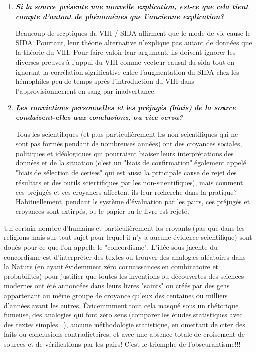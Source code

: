 \begin{enumerate}[label=\protect\circledbullet{\arabic*},leftmargin=15mm]
		\item \textit{\textbf{Si la source pr\'esente une nouvelle explication, est-ce que cela tient compte d'autant de ph\'enomènes que l'ancienne explication?}}
	
		Beaucoup de sceptiques du VIH / SIDA affirment que le mode de vie cause le SIDA. Pourtant, leur th\'eorie alternative n'explique pas autant de donn\'ees que la th\'eorie du VIH. Pour faire valoir leur argument, ils doivent ignorer les diverses preuves à l'appui du VIH comme vecteur causal du sida tout en ignorant la corr\'elation significative entre l'augmentation du SIDA chez les h\'emophiles peu de temps après l'introduction du VIH dans l'approvisionnement en sang par inadvertance.

		\item \textit{\textbf{Les convictions personnelles et les pr\'ejug\'es (biais) de la source conduisent-elles aux conclusions, ou vice versa?}}

		Tous les scientifiques (et plus particulièrement les non-scientifiques qui ne sont pas form\'es pendant de nombreuses ann\'ees) ont des croyances sociales, politiques et id\'eologiques qui pourraient biaiser leurs interpr\'etations des donn\'ees et de la situation (c'est un "biais de confirmation" \'egalement appel\'e "biais de s\'election de cerises" qui est aussi la principale cause de rejet des r\'esultats et des outils scientifiques par les non-scientifiques), mais comment ces pr\'ejug\'es et ces croyances affectent-ils leur recherche dans la pratique? Habituellement, pendant le système d'\'evaluation par les pairs, ces pr\'ejug\'es et croyances sont extirp\'es, ou le papier ou le livre est rejet\'e. 
	\end{enumerate}
	
	Un certain nombre d'humains et particulièrement les croyants (pas que dans les religions mais sur tout sujet pour lequel il n'y a aucune évidence scientifique) sont doués pour ce que l'on appelle le "concordisme". L'idée sous-jacente du concordisme est d'interpréter des textes ou trouver des analogies aléatoires dans la Nature (en ayant évidemment zéro connaissances en combinatoire et probabilités) pour justifier que toutes les inventions ou découvertes des sciences modernes ont été annoncées dans leurs livres "saints" ou créés par des gens appartenant au même groupe de croyance qu'eux des centaines ou milliers d'années avant les autres. Évidemmment tout cela masqué sous un rhétorique fumeuse, des analogies qui font zéro sens (comparer les études statistiques avec des textes simples...), aucune méthodologie statistique, en omettant de citer des faits ou conclusions contradictoires, et avec une absence totale de croisement de sources et de vérifications par les pairs! C’est le triomphe de l’obscurantisme!!!
	
